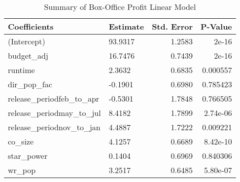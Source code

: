 \begin{table}[ht]
\centering
\begin{tabular}{llrr}
  \hline
Coefficients & Estimate & Std. Error & P-Value \\
  \hline
(Intercept) & 93.9317 & 1.2583 & 2e-16 \\
budget\_adj & 16.7476 & 0.7439 & 2e-16 \\
runtime & 2.3632 & 0.6835 & 0.000557 \\
dir\_pop\_fac & -0.1901 & 0.6980 & 0.785423 \\
release\_periodfeb\_to\_apr & -0.5301 & 1.7848 & 0.766505 \\
release\_periodmay\_to\_jul & 8.4182 & 1.7899 & 2.74e-06 \\
release\_periodnov\_to\_jan & 4.4887 & 1.7222 & 0.009221 \\
co\_size & 4.1257 & 0.6689 & 8.42e-10 \\
star\_power & 0.1404 & 0.6969 & 0.840306 \\
wr\_pop & 3.2517 & 0.6485 & 5.80e-07 \\
   \hline
\end{tabular}
\caption{Summary of Box-Office Profit Linear Model} 
\label{tab:lm_sum}
\end{table}